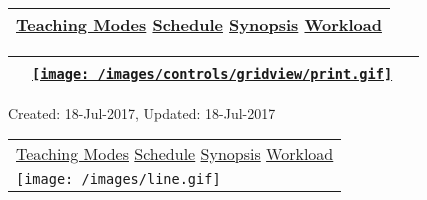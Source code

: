 ~

\hypertarget{ctl00_ctl00_ContentPlaceHolder1_ContentPlaceHolder1_pnlReferences}{}
\begin{longtable}[]{@{}l@{}}
\toprule
\protect\hypertarget{ctl00_ctl00_ContentPlaceHolder1_ContentPlaceHolder1_lblSectionBottom}{}{\protect\hyperlink{Teachingux5cux2520Modes}{Teaching
Modes} \textbar{} \protect\hyperlink{Schedule}{Schedule} \textbar{}
\protect\hyperlink{Synopsis}{Synopsis} \textbar{}
\protect\hyperlink{Workload}{Workload}}\tabularnewline
\bottomrule
\end{longtable}

\hypertarget{ctl00_ctl00_ContentPlaceHolder1_ContentPlaceHolder1_UP}{}
\hypertarget{contentstart}{}
\hypertarget{ctl00_ctl00_ContentPlaceHolder1_ContentPlaceHolder1_pnlMain}{}
\begin{longtable}[]{@{}ll@{}}
\toprule
&
{\href{javascript:PrintThisPage();}{\texttt{[image: /images/controls/gridview/print.gif]}}~~}\tabularnewline
\bottomrule
\end{longtable}

\protect\hypertarget{ctl00_ctl00_ContentPlaceHolder1_ContentPlaceHolder1_LV_UpdateInfo_ctrl0_txtDate}{}{Created:
18-Jul-2017, Updated: 18-Jul-2017}

\begin{longtable}[]{@{}l@{}}
\toprule
\protect\hypertarget{ctl00_ctl00_ContentPlaceHolder1_ContentPlaceHolder1_lblSectionTop}{}{\protect\hyperlink{Teachingux5cux2520Modes}{Teaching
Modes} \textbar{} \protect\hyperlink{Schedule}{Schedule} \textbar{}
\protect\hyperlink{Synopsis}{Synopsis} \textbar{}
\protect\hyperlink{Workload}{Workload}}\tabularnewline
\texttt{[image: /images/line.gif]}\tabularnewline
\bottomrule
\end{longtable}

